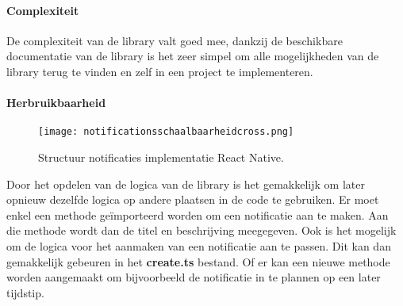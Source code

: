 \paragraph{Complexiteit}
De complexiteit van de library valt goed mee, dankzij de beschikbare documentatie van de library is het zeer 
simpel om alle mogelijkheden van de library terug te vinden en zelf in een project te implementeren. 

\paragraph{Herbruikbaarheid}
\begin{figure}[H]
    \centering
    \texttt{[image: notificationsschaalbaarheidcross.png]}
    \caption{Structuur notificaties implementatie React Native.}
\end{figure}
Door het opdelen van de logica van de library is het gemakkelijk om later opnieuw dezelfde logica op andere plaatsen 
in de code te gebruiken. Er moet enkel een methode geïmporteerd worden om een notificatie aan te maken. Aan die methode 
wordt dan de titel en beschrijving meegegeven. Ook is het mogelijk om de logica voor het aanmaken van een notificatie 
aan te passen. Dit kan dan gemakkelijk gebeuren in het \textbf{create.ts} bestand. Of er kan een nieuwe methode worden 
aangemaakt om bijvoorbeeld de notificatie in te plannen op een later tijdstip.